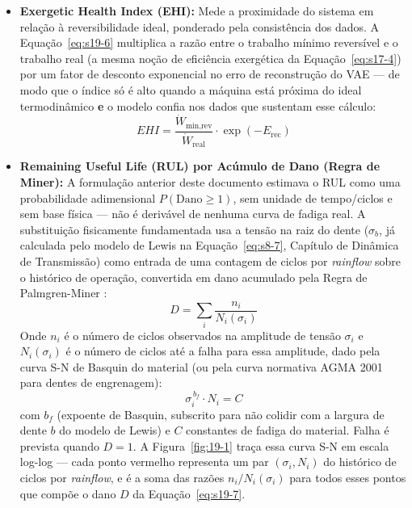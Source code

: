 \documentclass[12pt,a4paper]{article}
\numberwithin{equation}{section}
\numberwithin{table}{section}
\numberwithin{figure}{section}
\begin{document}
\begin{itemize}
	\item \textbf{Exergetic Health Index (EHI):} Mede a proximidade do sistema em relação à reversibilidade ideal, ponderado pela consistência dos dados. A Equação~\eqref{eq:s19-6} multiplica a razão entre o trabalho mínimo reversível e o trabalho real (a mesma noção de eficiência exergética da Equação~\eqref{eq:s17-4}) por um fator de desconto exponencial no erro de reconstrução do VAE — de modo que o índice só é alto quando a máquina está próxima do ideal termodinâmico \textbf{e} o modelo confia nos dados que sustentam esse cálculo:
	\begin{equation}\label{eq:s19-6}
 EHI = \frac{\dot{W}_{\text{min,rev}}}{\dot{W}_{\text{real}}} \cdotp \exp(-E_{\text{rec}})
\end{equation}
	
	\item \textbf{Remaining Useful Life (RUL) por Acúmulo de Dano (Regra de Miner):} A formulação anterior deste documento estimava o RUL como uma probabilidade adimensional $P(\text{Dano} \ge 1)$, sem unidade de tempo/ciclos e sem base física — não é derivável de nenhuma curva de fadiga real. A substituição fisicamente fundamentada usa a tensão na raiz do dente ($\sigma_b$, já calculada pelo modelo de Lewis na Equação~\eqref{eq:s8-7}, Capítulo de Dinâmica de Transmissão) como entrada de uma contagem de ciclos por \textit{rainflow} sobre o histórico de operação, convertida em dano acumulado pela Regra de Palmgren-Miner \cite{palmgren, miner}:
	\begin{equation}\label{eq:s19-7}
 D = \sum_{i} \frac{n_i}{N_i(\sigma_i)} 
\end{equation}
	Onde $n_i$ é o número de ciclos observados na amplitude de tensão $\sigma_i$ e $N_i(\sigma_i)$ é o número de ciclos até a falha para essa amplitude, dado pela curva S-N de Basquin \cite{basquin} do material (ou pela curva normativa AGMA 2001 \cite{agma2001} para dentes de engrenagem):
	\begin{equation}\label{eq:s19-8}
 \sigma_i^{\,b_f} \cdot N_i = C 
\end{equation}
	com $b_f$ (expoente de Basquin, subscrito para não colidir com a largura de dente $b$ do modelo de Lewis) e $C$ constantes de fadiga do material. Falha é prevista quando $D = 1$. A Figura~\ref{fig:19-1} traça essa curva S-N em escala log-log — cada ponto vermelho representa um par $(\sigma_i, N_i)$ do histórico de ciclos por \textit{rainflow}, e é a soma das razões $n_i/N_i(\sigma_i)$ para todos esses pontos que compõe o dano $D$ da Equação~\eqref{eq:s19-7}.


\end{itemize}
\end{document}
